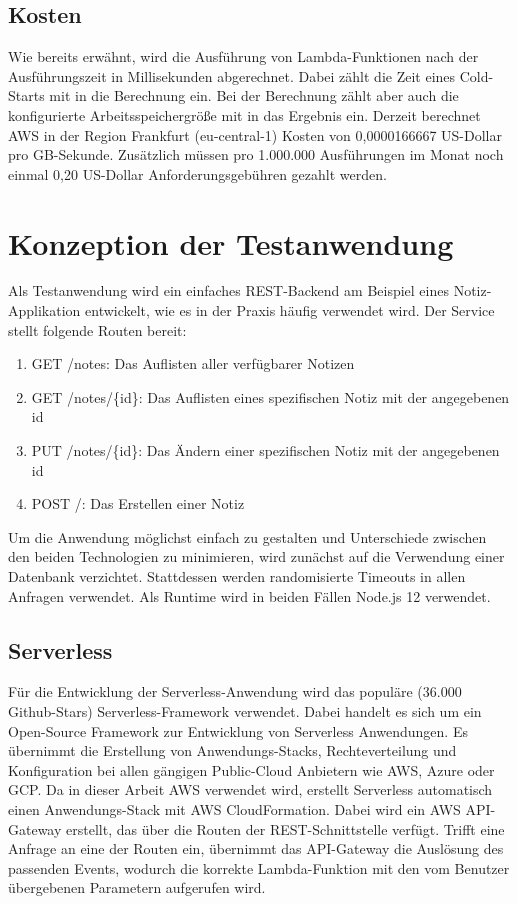 \subsection{Kosten}
Wie bereits erwähnt, wird die Ausführung von Lambda-Funktionen nach der Ausführungszeit in Millisekunden abgerechnet. Dabei zählt die Zeit eines Cold-Starts mit in die Berechnung ein. Bei der Berechnung zählt aber auch die konfigurierte Arbeitsspeichergröße mit in das Ergebnis ein. Derzeit berechnet AWS in der Region Frankfurt (eu-central-1) Kosten von 0,0000166667 US-Dollar pro GB-Sekunde\cite{noauthor_lambda_nodate}. Zusätzlich müssen pro 1.000.000 Ausführungen im Monat noch einmal 0,20 US-Dollar Anforderungsgebühren gezahlt werden.

\section{Konzeption der Testanwendung}
Als Testanwendung wird ein einfaches REST-Backend am Beispiel eines Notiz-Applikation entwickelt, wie es in der Praxis häufig verwendet wird. Der Service stellt folgende Routen bereit:  

\begin{enumerate}
    \item GET /notes: Das Auflisten aller verfügbarer Notizen
    \item GET /notes/\{id\}: Das Auflisten eines spezifischen Notiz mit der angegebenen id
    \item PUT /notes/\{id\}: Das Ändern einer spezifischen Notiz mit der angegebenen id
    \item POST /: Das Erstellen einer Notiz
\end{enumerate}

Um die Anwendung möglichst einfach zu gestalten und Unterschiede zwischen den beiden Technologien zu minimieren, wird zunächst auf die Verwendung einer Datenbank verzichtet. Stattdessen werden randomisierte Timeouts in allen Anfragen verwendet.
Als Runtime wird in beiden Fällen Node.js 12 verwendet.

\subsection{Serverless}
Für die Entwicklung der Serverless-Anwendung wird das populäre (36.000 Github-Stars) Serverless-Framework\cite{noauthor_serverless_nodate} verwendet. Dabei handelt es sich um ein Open-Source Framework zur Entwicklung von Serverless Anwendungen. Es übernimmt die Erstellung von Anwendungs-Stacks, Rechteverteilung und Konfiguration bei allen gängigen Public-Cloud Anbietern wie AWS, Azure oder GCP. Da in dieser Arbeit AWS verwendet wird, erstellt Serverless automatisch einen Anwendungs-Stack mit AWS CloudFormation. Dabei wird ein AWS API-Gateway erstellt, das über die Routen der REST-Schnittstelle verfügt. Trifft eine Anfrage an eine der Routen ein, übernimmt das API-Gateway die Auslösung des passenden Events, wodurch die korrekte Lambda-Funktion mit den vom Benutzer übergebenen Parametern aufgerufen wird. 

